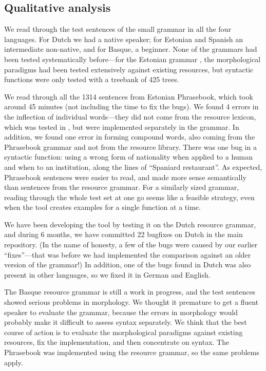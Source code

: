 \subsection{Qualitative analysis} 

We read through the test sentences of the small grammar in all the
four languages. 
For Dutch we had a native speaker; for Estonian and Spanish an
intermediate non-native, and for Basque, a beginner. None of the
grammars had been tested systematically before---for the Estonian grammar
\cite{listenmaa_kaljurand2014}, the morphological paradigms had been
tested extensively against existing resources, but syntactic functions
were only tested with a treebank of 425 trees.

We read through all the 1314 sentences from Estonian Phrasebook,
which took around 45 minutes (not including the time to fix the bugs).
We found 4 errors in the inflection of individual words---they did not
come from the resource lexicon, which was tested in
\cite{listenmaa_kaljurand2014}, but were implemented separately in the
grammar. In addition, we found one error in forming compound words,
also coming from the Phrasebook grammar and not from the resource
library. There was one bug in a syntactic function: using a wrong form
of nationality when applied to a human and when to an institution,
along the lines of ``Spaniard restaurant''. As expected, Phrasebook
sentences were easier to read, and made more sense semantically than
sentences from the resource grammar. For a similarly sized grammar,
reading through the whole test set at one go seems like a feasible
strategy, even when the tool creates examples for a single function at
a time.


We have been developing the tool by testing it on the Dutch resource
grammar, and during 6 months, we have committed 22 bugfixes on Dutch
in the \gf{} main repository. (In the name of honesty, a few of the bugs were
caused by our earlier ``fixes''---that was before we had implemented
the comparison against an older version of the grammar!) In addition,
one of the bugs found in Dutch was also present in other languages, so
we fixed it in German and English.

The Basque resource grammar is still a work in progress, and the
test sentences showed serious problems in morphology.
We thought it premature to get a fluent speaker to evaluate the grammar,
because the errors in morphology would probably make it
difficult to assess syntax separately. We think that the best course
of action is to evaluate the morphological paradigms against existing
resources, fix the implementation, and then concentrate on syntax.
The Phrasebook was implemented using the resource grammar, so the
same problems apply.






